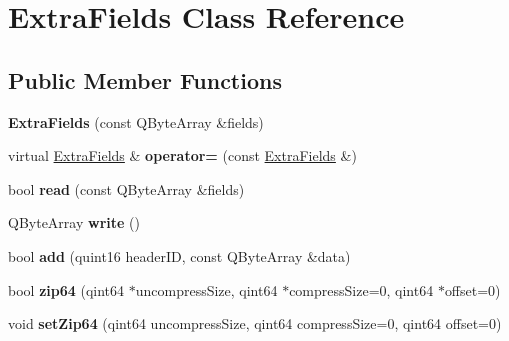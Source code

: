 \hypertarget{class_extra_fields}{}\section{Extra\+Fields Class Reference}
\label{class_extra_fields}
\subsection*{Public Member Functions}
\begin{DoxyCompactItemize}
\item 
{\bfseries Extra\+Fields} (const Q\+Byte\+Array \&fields)\hypertarget{class_extra_fields_a225c308bca6def17f43d6aae21ea13d9}{}\label{class_extra_fields_a225c308bca6def17f43d6aae21ea13d9}

\item 
virtual \hyperlink{class_extra_fields}{Extra\+Fields} \& {\bfseries operator=} (const \hyperlink{class_extra_fields}{Extra\+Fields} \&)\hypertarget{class_extra_fields_a30882a2550f75ebdce056f5fc15122aa}{}\label{class_extra_fields_a30882a2550f75ebdce056f5fc15122aa}

\item 
bool {\bfseries read} (const Q\+Byte\+Array \&fields)\hypertarget{class_extra_fields_ab62551d08d358aa020204f443ba553b5}{}\label{class_extra_fields_ab62551d08d358aa020204f443ba553b5}

\item 
Q\+Byte\+Array {\bfseries write} ()\hypertarget{class_extra_fields_a3df57227bc4d9ebdd645672c54d642d3}{}\label{class_extra_fields_a3df57227bc4d9ebdd645672c54d642d3}

\item 
bool {\bfseries add} (quint16 header\+ID, const Q\+Byte\+Array \&data)\hypertarget{class_extra_fields_add3e1980ff4e1a3b6b5219dfc5400c49}{}\label{class_extra_fields_add3e1980ff4e1a3b6b5219dfc5400c49}

\item 
bool {\bfseries zip64} (qint64 $\ast$uncompress\+Size, qint64 $\ast$compress\+Size=0, qint64 $\ast$offset=0)\hypertarget{class_extra_fields_a6cde92fd3de03e3e391f70dae0a6966e}{}\label{class_extra_fields_a6cde92fd3de03e3e391f70dae0a6966e}

\item 
void {\bfseries set\+Zip64} (qint64 uncompress\+Size, qint64 compress\+Size=0, qint64 offset=0)\hypertarget{class_extra_fields_a0464677c39751fac0ec07a68997609c9}{}\label{class_extra_fields_a0464677c39751fac0ec07a68997609c9}


\end{DoxyCompactItemize}
